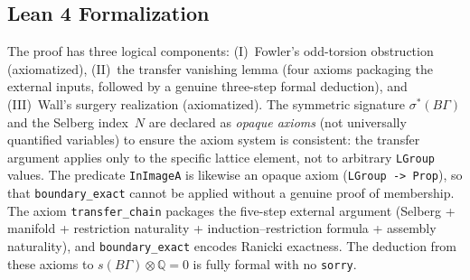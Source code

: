 \subsection*{Lean 4 Formalization}

The proof has three logical components: (I)~Fowler's odd-torsion obstruction
(axiomatized), (II)~the transfer vanishing lemma (four axioms packaging
the external inputs, followed by a genuine three-step formal deduction),
and (III)~Wall's surgery realization (axiomatized).
The symmetric signature $\sigma^*(B\Gamma)$ and the Selberg index~$N$ are
declared as \emph{opaque axioms} (not universally quantified variables) to
ensure the axiom system is consistent: the transfer argument applies only
to the specific lattice element, not to arbitrary \texttt{LGroup} values.
The predicate \texttt{InImageA} is likewise an opaque axiom
(\texttt{LGroup -> Prop}), so that \texttt{boundary\_exact} cannot be
applied without a genuine proof of membership.
The axiom \texttt{transfer\_chain} packages the five-step external argument
(Selberg + manifold + restriction naturality + induction--restriction formula
+ assembly naturality), and \texttt{boundary\_exact} encodes Ranicki
exactness.  The deduction from these axioms to
$s(B\Gamma)\otimes\mathbb Q=0$ is fully formal with no \texttt{sorry}.

